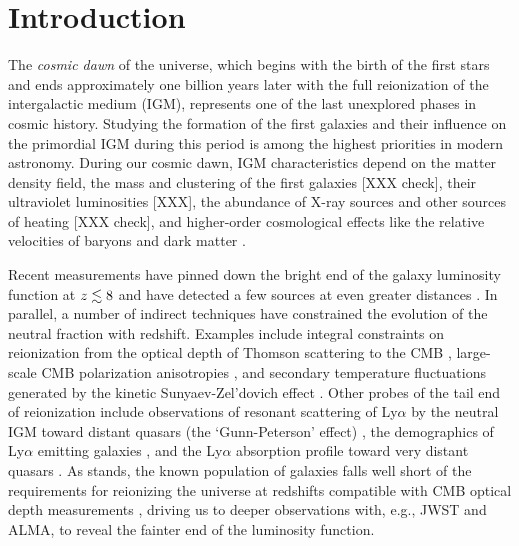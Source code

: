 \documentclass[twocolumn,numberedappendix]{emulateapj} \shorttitle{PSA64}
\begin{document}
\section{Introduction}

The {\it cosmic dawn} of the universe, which begins with the birth of the first stars and ends approximately
one billion years later with the full
reionization of the intergalactic medium (IGM), represents one of the last 
unexplored phases in cosmic history. 
Studying the formation of the first galaxies and their influence on the primordial IGM during this
period is among the highest priorities in modern astronomy.
During our cosmic dawn, IGM characteristics depend on the matter density field, the mass and clustering of 
the first galaxies \citep{lidz_et_al2008} [XXX check], their ultraviolet luminosities [XXX],
the abundance of X-ray sources and other sources of heating \citep{mesinger_et_al2013} [XXX check],
and higher-order cosmological effects like the relative velocities of baryons and dark matter \citep{visbal_et_al2012}.

Recent measurements
have pinned down the bright end of the galaxy luminosity function
at $z \lesssim 8$ \citep{bouwens_et_al2010,schenker_et_al2013} and have detected a few sources at even greater
distances \citep{ellis_et_al2013,oesch_et_al2013}. 
In parallel, a number of indirect techniques have constrained the evolution of the neutral fraction
with redshift. Examples include integral constraints on reionization from the
optical depth of Thomson scattering to the CMB \citep{planck_et_al2014,planck_et_al2015},
large-scale CMB polarization anisotropies \citep{page_et_al2007}, and
secondary temperature fluctuations generated by the kinetic Sunyaev-Zel'dovich effect \citep{zahn_et_al2012,mesinger_et_al2012,george_et_al2014}.
Other probes of the tail end of reionization include
observations of resonant scattering of Ly$\alpha$ by the neutral IGM toward
distant quasars (the `Gunn-Peterson' effect) \citep{fan_et_al2006},
the demographics of Ly$\alpha$ emitting galaxies \citep{schenker_et_al2013,treu_et_al2013,Faisst_et_al2014},
and the
Ly$\alpha$ absorption profile toward very distant quasars \citep{bolton_et_al2011}.
As stands, the known population of galaxies falls well short 
of the requirements for reionizing the universe at redshifts compatible
with CMB optical depth measurements \citep{robertson_et_al2013,robertson_et_al2015}, 
driving us to deeper observations with, e.g., JWST and ALMA, to reveal the fainter end of the luminosity function.
\end{document}
